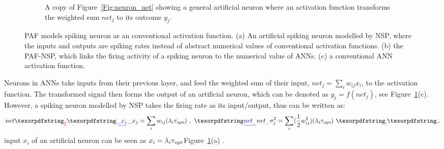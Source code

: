 \begin{figure}[tbh!]
\begin{subfigure}[t]{\textwidth}
			\bigskip
			\caption{A copy of Figure~\ref{Fig:neuron_net} showing a general artificial neuron where an activation function transforms the weighted sum $net_j$  to its outcome $y_j$.}
		\end{subfigure}
		\caption[PAF models spiking neuron as an conventional activation function.]{PAF models spiking neuron as an conventional activation function.
			(a) An artificial spiking neuron modelled by NSP, where the inputs and outputs are spiking rates instead of abstract numerical values of conventional activation functions.
			(b) the PAF-NSP, which links the firing activity of a spiking neuron to the numerical value of ANNs.
			(c) a conventional ANN activation function.}
		\label{Fig:tneuron}
	\end{figure}

	
	
	Neurons in ANNs take inputs from their previous layer, and feed the weighted sum of their input, $net_j = \sum_i w_{ij}x_i$, to the activation function.
	The transformed signal then forms the output of an artificial neuron, which can be denoted as $y_j=f(net_j)$, see Figure~\ref{Fig:tneuron}(c).
	However, a spiking neuron modelled by NSP takes the firing rate as its input/output, thus \DIFdelbegin {}\DIFdelend \DIFaddbegin {}\DIFaddend can be written as:
	\begin{equation}
	net\DIFdelbegin \DIFdel{_j }\DIFdelend \DIFaddbegin \DIFadd{\_x_{j} }\DIFaddend = \sum_i w_{ij}(\lambda_{i}\tau_{\textit{\textrm{syn}}})~,
	~\DIFaddbegin \DIFadd{net_\_}\DIFaddend \sigma^2_j= \sum_i (\frac{1}{2} w_{ij}^2)(\lambda_{i}\tau_{\textit{\textrm{syn}}})~\DIFdelbegin \DIFdel{, 
	}\DIFdelend \DIFaddbegin \DIFadd{.
	}\DIFaddend %
	\label{equ:mi_input}
	\end{equation}
	\DIFdelbegin {}\DIFdelend \DIFaddbegin {}\DIFaddend input $ x_i $ of an artificial \DIFaddbegin {}\DIFaddend neuron can be seen as $x_i=\lambda_{i}\tau_{\textit{\textrm{syn}}}$\DIFdelbegin {}\DIFdelend \DIFaddbegin {}\DIFaddend Figure~\ref{Fig:tneuron}(a) \DIFaddbegin {}\DIFaddend . 

